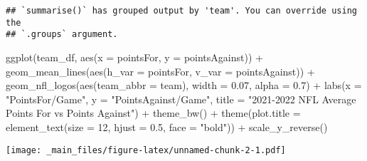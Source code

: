\documentclass[
]{article}
\newenvironment{Shaded}{\begin{snugshade}}{\end{snugshade}}
\newcommand{\AttributeTok}[1]{\textcolor[rgb]{0.77,0.63,0.00}{#1}}
\newcommand{\DecValTok}[1]{\textcolor[rgb]{0.00,0.00,0.81}{#1}}
\newcommand{\FloatTok}[1]{\textcolor[rgb]{0.00,0.00,0.81}{#1}}
\newcommand{\FunctionTok}[1]{\textcolor[rgb]{0.00,0.00,0.00}{#1}}
\newcommand{\NormalTok}[1]{#1}
\newcommand{\SpecialCharTok}[1]{\textcolor[rgb]{0.00,0.00,0.00}{#1}}
\newcommand{\StringTok}[1]{\textcolor[rgb]{0.31,0.60,0.02}{#1}}
\begin{document}
\begin{verbatim}
## `summarise()` has grouped output by 'team'. You can override using the
## `.groups` argument.
\end{verbatim}

\begin{Shaded}
\begin{Highlighting}[]
\FunctionTok{ggplot}\NormalTok{(team\_df, }\FunctionTok{aes}\NormalTok{(}\AttributeTok{x =}\NormalTok{ pointsFor, }\AttributeTok{y =}\NormalTok{ pointsAgainst)) }\SpecialCharTok{+}
  \FunctionTok{geom\_mean\_lines}\NormalTok{(}\FunctionTok{aes}\NormalTok{(}\AttributeTok{h\_var =}\NormalTok{ pointsFor, }\AttributeTok{v\_var =}\NormalTok{ pointsAgainst)) }\SpecialCharTok{+}
  \FunctionTok{geom\_nfl\_logos}\NormalTok{(}\FunctionTok{aes}\NormalTok{(}\AttributeTok{team\_abbr =}\NormalTok{ team), }\AttributeTok{width =} \FloatTok{0.07}\NormalTok{, }\AttributeTok{alpha =} \FloatTok{0.7}\NormalTok{) }\SpecialCharTok{+}
  \FunctionTok{labs}\NormalTok{(}\AttributeTok{x =} \StringTok{"PointsFor/Game"}\NormalTok{,}
       \AttributeTok{y =} \StringTok{"PointsAgainst/Game"}\NormalTok{,}
       \AttributeTok{title =} \StringTok{"2021{-}2022 NFL Average Points For vs Points Against"}\NormalTok{) }\SpecialCharTok{+}
  \FunctionTok{theme\_bw}\NormalTok{() }\SpecialCharTok{+}
  \FunctionTok{theme}\NormalTok{(}\AttributeTok{plot.title =} \FunctionTok{element\_text}\NormalTok{(}\AttributeTok{size =} \DecValTok{12}\NormalTok{, }\AttributeTok{hjust =} \FloatTok{0.5}\NormalTok{, }\AttributeTok{face =} \StringTok{"bold"}\NormalTok{)) }\SpecialCharTok{+}
  \FunctionTok{scale\_y\_reverse}\NormalTok{()}
\end{Highlighting}
\end{Shaded}

\texttt{[image: \_main\_files/figure-latex/unnamed-chunk-2-1.pdf]}
\end{document}
